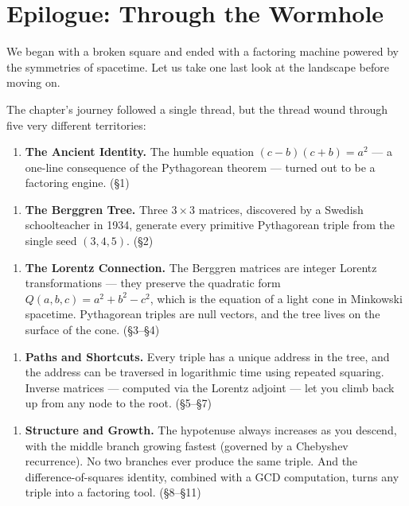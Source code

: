 \ornbreak



\section{Epilogue: Through the Wormhole}


We began with a broken square and ended with a factoring machine powered by the symmetries of spacetime. Let us take one last look at the landscape before moving on.

The chapter's journey followed a single thread, but the thread wound through five very different territories:

\begin{enumerate}[leftmargin=*]
\item \textbf{The Ancient Identity.} The humble equation $(c - b)(c + b) = a^2$ --- a one-line consequence of the Pythagorean theorem --- turned out to be a factoring engine. (§1)
\end{enumerate}

\begin{enumerate}[leftmargin=*]
\item \textbf{The Berggren Tree.} Three $3 \times 3$ matrices, discovered by a Swedish schoolteacher in 1934, generate every primitive Pythagorean triple from the single seed $(3, 4, 5)$. (§2)
\end{enumerate}

\begin{enumerate}[leftmargin=*]
\item \textbf{The Lorentz Connection.} The Berggren matrices are integer Lorentz transformations --- they preserve the quadratic form $Q(a, b, c) = a^2 + b^2 - c^2$, which is the equation of a light cone in Minkowski spacetime. Pythagorean triples are null vectors, and the tree lives on the surface of the cone. (§3–§4)
\end{enumerate}

\begin{enumerate}[leftmargin=*]
\item \textbf{Paths and Shortcuts.} Every triple has a unique address in the tree, and the address can be traversed in logarithmic time using repeated squaring. Inverse matrices --- computed via the Lorentz adjoint --- let you climb back up from any node to the root. (§5–§7)
\end{enumerate}

\begin{enumerate}[leftmargin=*]
\item \textbf{Structure and Growth.} The hypotenuse always increases as you descend, with the middle branch growing fastest (governed by a Chebyshev recurrence). No two branches ever produce the same triple. And the difference-of-squares identity, combined with a GCD computation, turns any triple into a factoring tool. (§8–§11)
\end{enumerate}

